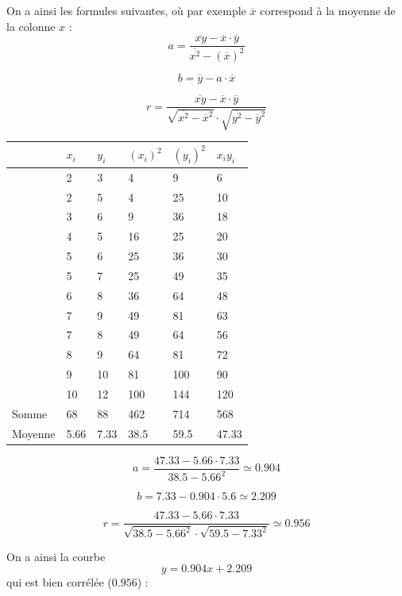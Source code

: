 On a ainsi les formules suivantes, où par exemple $\overline{x}$ correspond à la moyenne de la colonne $x$ :
$$
a  = \frac{\overline{xy}-\overline{x}\cdot \overline{y}}{\overline{x^2}-\left(\overline{x}\right)^2}
$$

$$
b = \overline{y}-a\cdot \overline{x}
$$

$$
r = \frac{\overline{xy}- \overline{x}\cdot \overline{y}}{\sqrt{\overline{x^2}-\overline{x}^2} \cdot \sqrt{\overline{y^2}-\overline{y}^2}}
$$

\begin{exemple}

\begin{tabular}{|l|l|l|l|l|l|}
\hline
      & $x_i$ & $y_i$ & $(x_i)^2$ & $(y_i)^2$ & $x_i y_i$ \\
      \hline
      & 2  & 3  & 4     & 9     & 6    \\
      \hline
      & 2  & 5  & 4     & 25    & 10   \\
      \hline
      & 3  & 6  & 9     & 36    & 18   \\
      \hline
      & 4  & 5  & 16    & 25    & 20   \\
      \hline
      & 5  & 6  & 25    & 36    & 30   \\
      \hline
      & 5  & 7  & 25    & 49    & 35   \\
      \hline
      & 6  & 8  & 36    & 64    & 48   \\
      \hline
      & 7  & 9  & 49    & 81    & 63   \\
      \hline
      & 7  & 8  & 49    & 64    & 56   \\
      \hline
      & 8  & 9  & 64    & 81    & 72   \\
      \hline
      & 9  & 10 & 81    & 100   & 90   \\
      \hline
      & 10 & 12 & 100   & 144   & 120  \\
      \hline
Somme   & 68 & 88 & 462   & 714   & 568  \\
\hline
Moyenne &  5.66  &  7.33  &   38.5    &   59.5    &   47.33 \\ 
\hline
\end{tabular}

$$
a = \frac{47.33-5.66\cdot 7.33}{38.5 - 5.66^2} \simeq 0.904
$$

$$
b = 7.33 - 0.904 \cdot 5.6 \simeq 2.209
$$

$$
r = \frac{47.33-5.66\cdot 7.33}{\sqrt{38.5-5.66^2} \cdot \sqrt{59.5 - 7.33^2}}\simeq 0.956
$$

On a ainsi la courbe 
$$
y = 0.904 x + 2.209
$$
qui est bien corrélée ($0.956$) :


\end{exemple}
